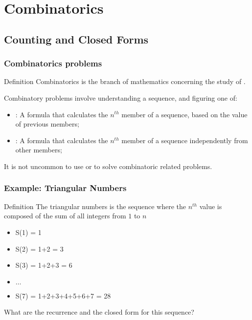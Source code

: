 \documentclass{beamer}
\begin{document}
\section{Combinatorics}
\subsection{Counting and Closed Forms}
\begin{frame}
  \frametitle{Combinatorics problems}

  {\smaller
    \begin{block}{Definition}
      Combinatorics is the branch of mathematics concerning the study of
      .
    \end{block}

    Combinatory problems involve understanding a sequence, and
    figuring one of:

    \medskip

    \begin{itemize}
    \item {}: A formula that calculates the
      $n^{th}$ member of a sequence, based on the value of previous members;

    \item {}: A formula that calculates the
      $n^{th}$ member of a sequence independently from other members;
    \end{itemize}

  \bigskip

  It is not uncommon to use  or
   to solve combinatoric related problems.
  }
\end{frame}

\begin{frame}
  \frametitle{Example: Triangular Numbers}
  {\smaller
  \begin{block}{Definition}
    The triangular numbers is the sequence where the $n^{th}$ value is
    composed of the sum of all integers from $1$ to $n$
  \end{block}

  \begin{itemize}
  \item S(1) = 1
  \item S(2) = 1+2 = 3
  \item S(3) = 1+2+3 = 6
  \item $\ldots$
  \item S(7) = 1+2+3+4+5+6+7 = 28
  \end{itemize}
  }

  What are the recurrence and the closed form for this sequence?
\end{frame}
\end{document}
